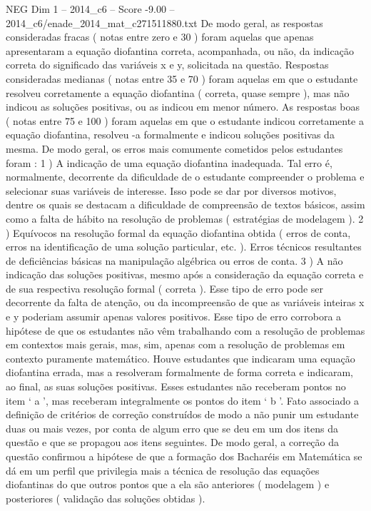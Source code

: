 \begin{textsample}{NEG Dim 1 – 2014\_c6 – Score -9.00 – 2014\_c6/enade\_2014\_mat\_c271511880.txt}
De modo geral, as respostas consideradas fracas ( notas entre zero e 30 ) foram aquelas que apenas apresentaram a equação diofantina correta, acompanhada, ou não, da indicação correta do significado das variáveis x e y, solicitada na questão.
Respostas consideradas medianas ( notas entre 35 e 70 ) foram aquelas em que o estudante resolveu corretamente a equação diofantina ( correta, quase sempre ), mas não indicou as soluções positivas, ou as indicou em menor número.
As respostas boas ( notas entre 75 e 100 ) foram aquelas em que o estudante indicou corretamente a equação diofantina, resolveu -a formalmente e indicou soluções positivas da mesma.
De modo geral, os erros mais comumente cometidos pelos estudantes foram : 1 ) A indicação de uma equação diofantina inadequada.
Tal erro é, normalmente, decorrente da dificuldade de o estudante compreender o problema e selecionar suas variáveis de interesse.
Isso pode se dar por diversos motivos, dentre os quais se destacam a dificuldade de compreensão de textos básicos, assim como a falta de hábito na resolução de problemas ( estratégias de modelagem ). 2 ) Equívocos na resolução formal da equação diofantina obtida ( erros de conta, erros na identificação de uma solução particular, etc. ).
Erros técnicos resultantes de deficiências básicas na manipulação algébrica ou erros de conta. 3 ) A não indicação das soluções positivas, mesmo após a consideração da equação correta e de sua respectiva resolução formal ( correta ).
Esse tipo de erro pode ser decorrente da falta de atenção, ou da incompreensão de que as variáveis inteiras x e y poderiam assumir apenas valores positivos.
Esse tipo de erro corrobora a hipótese de que os estudantes não vêm trabalhando com a resolução de problemas em contextos mais gerais, mas, sim, apenas com a resolução de problemas em contexto puramente matemático.
Houve estudantes que indicaram uma equação diofantina errada, mas a resolveram formalmente de forma correta e indicaram, ao final, as suas soluções positivas.
Esses estudantes não receberam pontos no item ‘ a ’, mas receberam integralmente os pontos do item ‘ b ’.
Fato associado a definição de critérios de correção construídos de modo a não punir um estudante duas ou mais vezes, por conta de algum erro que se deu em um dos itens da questão e que se propagou aos itens seguintes.
De modo geral, a correção da questão confirmou a hipótese de que a formação dos Bacharéis em Matemática se dá em um perfil que privilegia mais a técnica de resolução das equações diofantinas do que outros pontos que a ela são anteriores ( modelagem ) e posteriores ( validação das soluções obtidas ).

\end{textsample}
